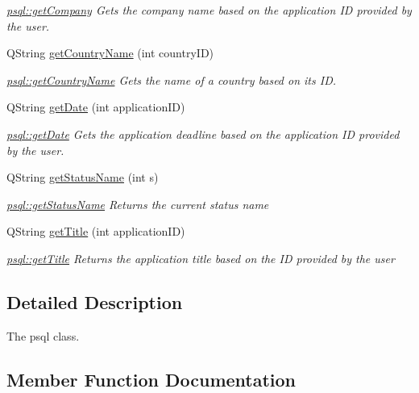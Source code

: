 \begin{DoxyCompactItemize}
\begin{DoxyCompactList}\small\item\em \hyperlink{classpsql_a09745cd03f09ffb2dacacaab4281915f}{psql\+::get\+Company} Gets the company name based on the application ID provided by the user. \end{DoxyCompactList}\item 
Q\+String \hyperlink{classpsql_a5724e9992e6a5c98524ab73b98f4202d}{get\+Country\+Name} (int country\+ID)
\begin{DoxyCompactList}\small\item\em \hyperlink{classpsql_a5724e9992e6a5c98524ab73b98f4202d}{psql\+::get\+Country\+Name} Gets the name of a country based on its ID. \end{DoxyCompactList}\item 
Q\+String \hyperlink{classpsql_a561f96bfe7e9d092077712dd6b186af8}{get\+Date} (int application\+ID)
\begin{DoxyCompactList}\small\item\em \hyperlink{classpsql_a561f96bfe7e9d092077712dd6b186af8}{psql\+::get\+Date} Gets the application deadline based on the application ID provided by the user. \end{DoxyCompactList}\item 
Q\+String \hyperlink{classpsql_a5c2a64419a68a258071fd1f9a37c7c09}{get\+Status\+Name} (int s)
\begin{DoxyCompactList}\small\item\em \hyperlink{classpsql_a5c2a64419a68a258071fd1f9a37c7c09}{psql\+::get\+Status\+Name} Returns the current status name \end{DoxyCompactList}\item 
Q\+String \hyperlink{classpsql_ada9e3be3e0866011edf53e30ec510afc}{get\+Title} (int application\+ID)
\begin{DoxyCompactList}\small\item\em \hyperlink{classpsql_ada9e3be3e0866011edf53e30ec510afc}{psql\+::get\+Title} Returns the application title based on the ID provided by the user \end{DoxyCompactList}\end{DoxyCompactItemize}


\subsection{Detailed Description}
The psql class. 

\subsection{Member Function Documentation}
\mbox{\label{classpsql_ada485c933df77453629e3821ab19fa4c}} 
